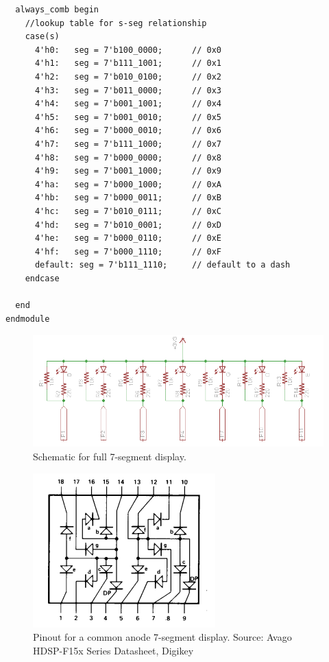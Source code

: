 \documentclass[11pt]{article}
\begin{document}
\begin{verbatim}
  always_comb begin
    //lookup table for s-seg relationship
    case(s)
      4'h0:   seg = 7'b100_0000;      // 0x0
      4'h1:   seg = 7'b111_1001;      // 0x1
      4'h2:   seg = 7'b010_0100;      // 0x2
      4'h3:   seg = 7'b011_0000;      // 0x3
      4'h4:   seg = 7'b001_1001;      // 0x4
      4'h5:   seg = 7'b001_0010;      // 0x5
      4'h6:   seg = 7'b000_0010;      // 0x6
      4'h7:   seg = 7'b111_1000;      // 0x7
      4'h8:   seg = 7'b000_0000;      // 0x8
      4'h9:   seg = 7'b001_1000;      // 0x9
      4'ha:   seg = 7'b000_1000;      // 0xA
      4'hb:   seg = 7'b000_0011;      // 0xB
      4'hc:   seg = 7'b010_0111;      // 0xC
      4'hd:   seg = 7'b010_0001;      // 0xD
      4'he:   seg = 7'b000_0110;      // 0xE
      4'hf:   seg = 7'b000_1110;      // 0xF
      default: seg = 7'b111_1110;     // default to a dash
    endcase
   
  end
endmodule

\end{verbatim}


\begin{figure}[h!]
\centering
\includegraphics[scale=0.8]{seven_segment.png}
\caption{Schematic for full 7-segment display.}
\label{figure:seven_segment}
\end{figure} 


\begin{figure}[h!]
\centering
\includegraphics[scale=1]{seven_segment_pinout.png}
\caption{Pinout for a common anode 7-segment display. Source: Avago HDSP-F15x Series Datasheet, Digikey
}
\label{figure:seven_segment_pinout}
\end{figure} 
\end{document}
